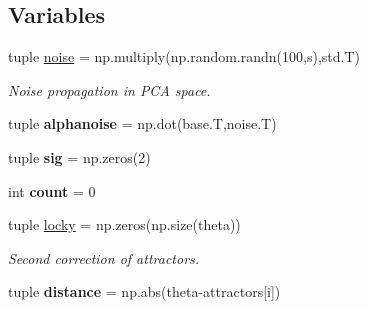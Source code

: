 \subsection*{Variables}
\begin{DoxyCompactItemize}
\item 
\hypertarget{namespace_m2_c_a_d_1_1pca__ring__spectrum_a0099a36ef2970012b78d6fc716d6707b}{}tuple \hyperlink{namespace_m2_c_a_d_1_1pca__ring__spectrum_a0099a36ef2970012b78d6fc716d6707b}{noise} = np.\+multiply(np.\+random.\+randn(100,s),std.\+T)\label{namespace_m2_c_a_d_1_1pca__ring__spectrum_a0099a36ef2970012b78d6fc716d6707b}

\begin{DoxyCompactList}\small\item\em Noise propagation in P\+C\+A space. \end{DoxyCompactList}\item 
\hypertarget{namespace_m2_c_a_d_1_1pca__ring__spectrum_a8685d65942470fb8742b5a6d41da0769}{}tuple {\bfseries alphanoise} = np.\+dot(base.\+T,noise.\+T)\label{namespace_m2_c_a_d_1_1pca__ring__spectrum_a8685d65942470fb8742b5a6d41da0769}

\item 
\hypertarget{namespace_m2_c_a_d_1_1pca__ring__spectrum_a190a7f9351189e5a4b7addd54de129e6}{}tuple {\bfseries sig} = np.\+zeros(2)\label{namespace_m2_c_a_d_1_1pca__ring__spectrum_a190a7f9351189e5a4b7addd54de129e6}

\item 
\hypertarget{namespace_m2_c_a_d_1_1pca__ring__spectrum_ad43c3812e6d13e0518d9f8b8f463ffcf}{}int {\bfseries count} = 0\label{namespace_m2_c_a_d_1_1pca__ring__spectrum_ad43c3812e6d13e0518d9f8b8f463ffcf}

\item 
\hypertarget{namespace_m2_c_a_d_1_1pca__ring__spectrum_ae55557fe6f9ff6d7effc7c038223e68e}{}tuple \hyperlink{namespace_m2_c_a_d_1_1pca__ring__spectrum_ae55557fe6f9ff6d7effc7c038223e68e}{locky} = np.\+zeros(np.\+size(theta))\label{namespace_m2_c_a_d_1_1pca__ring__spectrum_ae55557fe6f9ff6d7effc7c038223e68e}

\begin{DoxyCompactList}\small\item\em Second correction of attractors. \end{DoxyCompactList}\item 
\hypertarget{namespace_m2_c_a_d_1_1pca__ring__spectrum_adce4de88f694e4208602ec147ca6aa3f}{}tuple {\bfseries distance} = np.\+abs(theta-\/attractors\mbox{[}i\mbox{]})\label{namespace_m2_c_a_d_1_1pca__ring__spectrum_adce4de88f694e4208602ec147ca6aa3f}


\end{DoxyCompactItemize}
